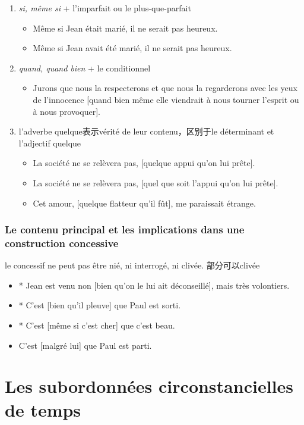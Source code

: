 \documentclass[UTF8]{report}
\begin{document}
\begin{enumerate}
    \item \textit{si, même si} + l’imparfait ou le plus-que-parfait
    \begin{itemize}
        \item Même si Jean était marié, il ne serait pas heureux.
        \item Même si Jean avait été marié, il ne serait pas heureux.
    \end{itemize}
    \item \textit{quand, quand bien} + le conditionnel 
    \begin{itemize}
        \item Jurons que nous la respecterons et que nous la regarderons avec les yeux de l’innocence [quand bien même elle viendrait à nous tourner l’esprit ou à nous provoquer]. 
    \end{itemize}
    \item l'adverbe quelque表示vérité de leur contenu，区别于le déterminant et l’adjectif quelque
    \begin{itemize}
        \item La société ne se relèvera pas, [quelque appui qu’on lui prête].
        \item La société ne se relèvera pas, [quel que soit l’appui qu’on lui prête].
        \item Cet amour, [quelque flatteur qu’il fût], me paraissait étrange.
    \end{itemize}
\end{enumerate}

\subsubsection{Le contenu principal et les implications dans une construction concessive}
le concessif ne peut pas être nié, ni interrogé, ni clivée. 部分可以clivée
\begin{itemize}
    \item * Jean est venu non [bien qu’on le lui ait déconseillé], mais très volontiers.
    \item * C’est [bien qu’il pleuve] que Paul est sorti.
    \item * C’est [même si c’est cher] que c’est beau.
    \item C’est [malgré lui] que Paul est parti.
\end{itemize}


\section{Les subordonnées circonstancielles de temps}
\end{document}
